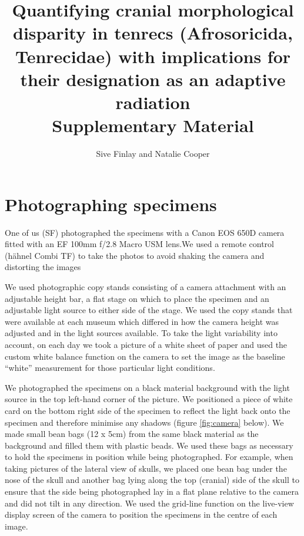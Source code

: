 \documentclass[12pt,a4paper]{article}
\begin{document}
\title{
       Quantifying cranial morphological disparity in tenrecs (Afrosoricida, Tenrecidae) with implications for their designation as an adaptive radiation\\
       \bigskip
       Supplementary Material }
\author{Sive Finlay and Natalie Cooper}
\date{}
\maketitle





\section{Photographing specimens}
One of us (SF) photographed the specimens with a Canon EOS 650D camera fitted with an EF 100mm f/2.8 Macro USM lens.We used a remote control (h\"ahnel Combi TF) to take the photos to avoid shaking the camera and distorting the images

We used photographic copy stands consisting of a camera attachment with an adjustable height bar, a flat stage on which to place the specimen and an adjustable light source to either side of the stage. We used the copy stands that were available at each museum which differed in how the camera height was adjusted and in the light sources available.
To take the light variability into account, on each day we took a picture of a white sheet of paper and used the custom white balance function on the camera to set the image as the baseline “white” measurement for those particular light conditions.

We photographed the specimens on a black material background with the light source in the top left-hand corner of the picture. We positioned a piece of white card on the bottom right side of the specimen to reflect the light back onto the specimen and therefore minimise any shadows (figure \ref{fig:camera} below).
We made small bean bags (12 x 5cm) from the same black material as the background and filled them with plastic beads. We used these bags as necessary to hold the specimens in position while being photographed. For example, when taking pictures of the lateral view of skulls, we placed one bean bag under the nose of the skull and another bag lying along the top (cranial) side of the skull to ensure that the side being photographed lay in a flat plane relative to the camera and did not tilt in any direction. 
We used the grid-line function on the live-view display screen of the camera to position the specimens in the centre of each image. 
\end{document}
